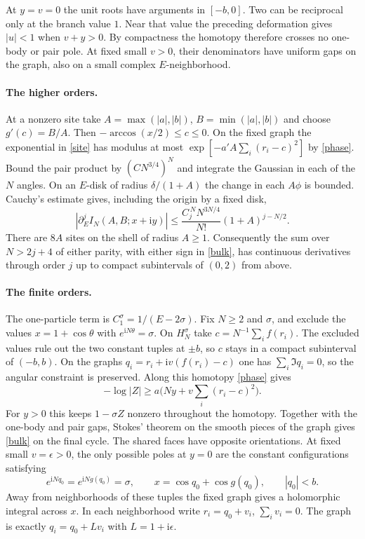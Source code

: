 \documentclass[11pt]{article}
\newcommand{\ii}{\mathrm i}
\begin{document}
At $y=v=0$ the unit roots have arguments in $[-b,0]$. Two can be
reciprocal only at the branch value $1$. Near that value the preceding
deformation gives $|u|<1$ when $v+y>0$. By compactness the homotopy
therefore crosses no one-body or pair pole. At fixed small $v>0$,
their denominators have uniform gaps on the graph, also on a small
complex $E$-neighborhood.

\paragraph{The higher orders.}
At a nonzero site take $A=\max(|a|,|b|)$, $B=\min(|a|,|b|)$ and
choose $g'(c)=B/A$. Then $-\arccos(x/2)\le c\le0$. On the fixed graph
the exponential in \eqref{site} has modulus at most
$\exp[-a' A\sum_i(r_i-c)^2]$ by \eqref{phase}. Bound the pair product
by $(C N^{3/4})^N$ and integrate the Gaussian in each of the $N$ angles.
On an $E$-disk of radius $\delta/(1+A)$ the change in each $A\phi$
is bounded. Cauchy's estimate gives, including the origin by a fixed disk,
\begin{equation}\label{sites-bound}
 |\partial_E^j I_N(A,B;x+\ii y)|\le
 \frac{C_j^{\,N}N^{3N/4}}{N!}(1+A)^{j-N/2}.
\end{equation}
There are $8A$ sites on the shell of radius $A\ge1$. Consequently
the sum over $N>2j+4$ of either parity, with either sign in
\eqref{bulk}, has continuous derivatives through order $j$ up to
compact subintervals of $(0,2)$ from above.

\paragraph{The finite orders.}
The one-particle term is $C_1^\sigma=1/(E-2\sigma)$.
Fix $N\ge2$ and $\sigma$, and exclude the values $x=1+\cos\theta$ with
$e^{\ii N\theta}=\sigma$. On $H_N^\sigma$ take
$c=N^{-1}\sum_i f(r_i)$. The excluded values rule out the two constant
tuples at $\pm b$, so $c$ stays in a compact subinterval of $(-b,b)$.
On the graphs
$q_i=r_i+\ii v(f(r_i)-c)$ one has $\sum_i\Im q_i=0$, so the
angular constraint is preserved.
Along this homotopy \eqref{phase} gives
\[
 -\log |Z|\ge a\bigl(Ny+v\textstyle\sum_i(r_i-c)^2\bigr).
\]
For $y>0$ this keeps $1-\sigma Z$ nonzero throughout the homotopy.
Together with the one-body and pair gaps, Stokes' theorem on the
smooth pieces of the graph gives \eqref{bulk} on the final cycle.
The shared faces have opposite orientations.
At fixed small $v=\epsilon>0$, the only possible poles at $y=0$ are
the constant configurations satisfying
\begin{equation}\label{res}
 e^{\ii N q_0}=e^{\ii N g(q_0)}=\sigma,\qquad
 x=\cos q_0+\cos g(q_0),\qquad |q_0|<b .
\end{equation}
Away from neighborhoods of these tuples the fixed graph gives a
holomorphic integral across $x$. In each neighborhood write
$r_i=q_0+v_i$, $\sum_i v_i=0$. The graph is exactly
$q_i=q_0+L v_i$ with $L=1+\ii\epsilon$.
\end{document}
